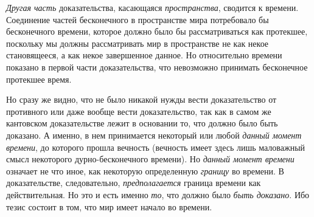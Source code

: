 {\em Другая часть} доказательства, касающаяся
{\em пространства}, сводится к времени. Соединение
частей бесконечного в пространстве мира потребовало бы бесконечного
времени, которое должно было бы рассматриваться как протекшее, поскольку мы
должны рассматривать мир в пространстве не как некое становящееся, а как
некое завершенное данное. Но относительно времени показано в первой части
доказательства, что невозможно принимать бесконечное протекшее время.

Но сразу же видно, что не было никакой нужды вести доказательство от
противного или даже вообще вести доказательство, так как в самом же
кантовском доказательстве лежит в основании то, что должно было быть
доказано. А именно, в нем принимается некоторый или любой
{\em данный момент времени}, до которого прошла
вечность (вечность имеет здесь лишь маловажный смысл некоторого
дурно-бесконечного времени). Но {\em данный момент
времени} означает не что иное, как некоторую определенную
{\em границу} во времени. В доказательстве,
следовательно, {\em предполагается} граница времени как
действительная. Но это и есть именно {\em то}, что
должно было {\em быть доказано}. Ибо тезис состоит в
том, что мир имеет начало во времени.

